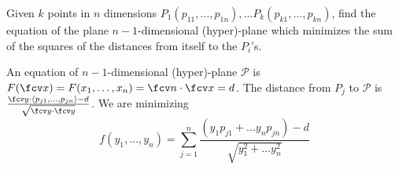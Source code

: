 \begin{frame}
\begin{example}
Given $k$ points in $n$ dimensions $P_1(p_{11},\dots, p_{1n}),\dots P_{k}(p_{k1},\dots, p_{kn})$, find the equation of the plane $n-1$-dimensional (hyper)-plane which minimizes the sum of the squares of the distances from itself to the $P_i$'s.

An equation of $n-1$-dimensional (hyper)-plane $\mathcal P$ is $F(\fcv x)=F(x_1, \dots, x_n) = \fcv n\cdot \fcv x= d$. The distance from $P_j$ to $\mathcal P$ is $\frac{\fcv y\cdot \langle p_{j1},\dots, p_{jn}\rangle -d}{ \sqrt{\fcv y\cdot \fcv y}}$. We are minimizing 
\[
f( y_1,\dots, y_n)= \sum_{j=1}^{n} \frac{\left( y_1p_{j1}+\dots y_np_{jn}\right)-d}{\sqrt{y_1^2+\dots y_n^2}}
\]
\end{example}
\end{frame}